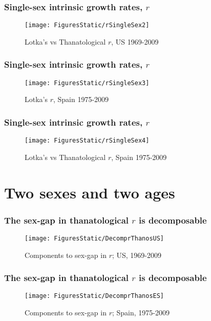 \documentclass{beamer}
\begin{document}
\begin{frame}
\frametitle{Single-sex intrinsic growth rates, $r$}
\vspace{-2em}
\begin{figure}
      \centering
      \caption*{Lotka's vs Thanatological $r$, US 1969-2009}
      \texttt{[image: FiguresStatic/rSingleSex2]}
\end{figure}
\end{frame}

\begin{frame}
\frametitle{Single-sex intrinsic growth rates, $r$}
\vspace{-2em}
\begin{figure}
      \centering
      \caption*{Lotka's $r$, Spain 1975-2009}
      \texttt{[image: FiguresStatic/rSingleSex3]}
\end{figure}
\end{frame}

\begin{frame}
\frametitle{Single-sex intrinsic growth rates, $r$}
\vspace{-2em}
\begin{figure}
      \centering
      \caption*{Lotka's vs Thanatological $r$, Spain 1975-2009}
      \texttt{[image: FiguresStatic/rSingleSex4]}
\end{figure}
\end{frame}

\section{Two sexes and two ages}


\begin{frame}
  \frametitle{The sex-gap in thanatological $r$ is decomposable}
  \vspace{-2em}
\begin{figure}
\centering
\caption*{Components to sex-gap in $r$; US, 1969-2009}
\texttt{[image: FiguresStatic/DecomprThanosUS]}
\end{figure}
\end{frame}


\begin{frame}
  \frametitle{The sex-gap in thanatological $r$ is decomposable}
  \vspace{-2em}
\begin{figure}
\centering
\caption*{Components to sex-gap in $r$; Spain, 1975-2009}
\texttt{[image: FiguresStatic/DecomprThanosES]}
\end{figure}
\end{frame}
\end{document}
